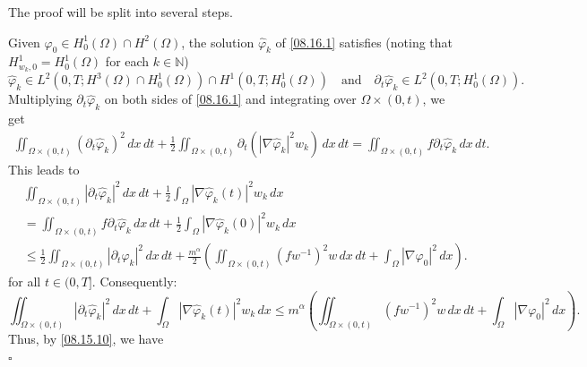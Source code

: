 \documentclass[11pt]{article}
\newenvironment{proof}{{\bf {Proof.}}}{\hfill $\square$}
\numberwithin{equation}{section}
\def\bf{\textbf}
\begin{document}
 \begin{proof}  The proof will be split into several steps.

 Given $\varphi_0 \in H_0^1(\Omega) \cap H^2(\Omega)$, the solution $\widehat{\varphi}_k$ of \eqref{08.16.1} satisfies (noting that $H_{w_k,0}^1 = H_0^1(\Omega)$ for each $k \in \mathbb{N}$)
\begin{equation}\label{12.25.1}
\widehat{\varphi}_k \in L^2(0,T; H^3(\Omega) \cap H_0^1(\Omega)) \cap H^1(0,T; H_0^1(\Omega))   \quad \text{and} \quad   \partial_t \widehat{\varphi}_k \in L^2(0,T; H_0^1(\Omega)).
\end{equation}
Multiplying $\partial_t \widehat{\varphi}_k$ on both sides of \eqref{08.16.1} and integrating over $\Omega \times (0,t)$, we get
\begin{equation*}
\begin{split}
\iint_{\Omega \times (0,t)} (\partial_t \widehat{\varphi}_k)^2 \, dx \, dt + \frac{1}{2} \iint_{\Omega \times (0,t)} \partial_t \left( |\nabla \widehat{\varphi}_k|^2 w_k \right) \, dx \, dt = \iint_{\Omega \times (0,t)} f \partial_t \widehat{\varphi}_k \, dx \, dt.
\end{split}
\end{equation*}
This leads to
\begin{equation*}
\begin{split}
&\iint_{\Omega \times (0,t)} |\partial_t \widehat{\varphi}_k|^2 \, dx \, dt + \frac{1}{2} \int_\Omega |\nabla \widehat{\varphi}_k(t)|^2 w_k \, dx \\
&= \iint_{\Omega \times (0,t)} f \partial_t \widehat{\varphi}_k \, dx \, dt + \frac{1}{2} \int_\Omega |\nabla \widehat{\varphi}_k(0)|^2 w_k \, dx \\
&\leq \frac{1}{2} \iint_{\Omega \times (0,t)} |\partial_t \widehat{\varphi}_k|^2 \, dx \, dt + \frac{m^\alpha}{2} \left( \iint_{\Omega \times (0,t)} (f w^{-1})^2 w \, dx \, dt + \int_\Omega |\nabla \varphi_0|^2 \, dx \right).
\end{split}
\end{equation*}
for all $t \in (0,T]$.
Consequently:
\begin{equation}\label{12.09.3}
\iint_{\Omega \times (0,t)} |\partial_t \widehat{\varphi}_k|^2 \, dx \, dt + \int_\Omega |\nabla \widehat{\varphi}_k(t)|^2 w_k \, dx \leq m^\alpha \left( \iint_{\Omega \times (0,t)} (f w^{-1})^2 w \, dx \, dt + \int_\Omega |\nabla \varphi_0|^2 \, dx \right).
\end{equation}
Thus, by \eqref{08.15.10}, we have
\begin{equation}\label{08.23.2}

\end{equation}
\end{proof}
\end{document}
